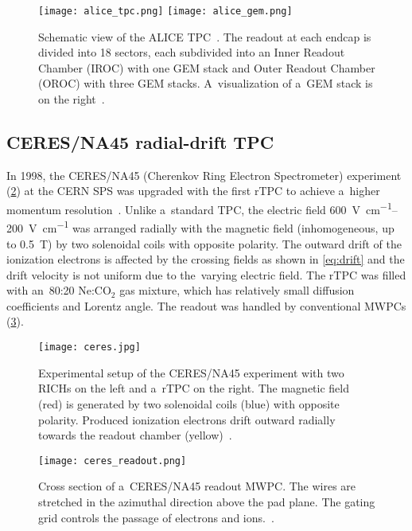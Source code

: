 			\begin{figure}
				\centering
				\texttt{[image: alice\_tpc.png]}
				\hfill
				\texttt{[image: alice\_gem.png]}
				\caption{Schematic view of the ALICE \ac{TPC}~\cite{ALICE_upgrade2}. The readout at each endcap is divided into 18 sectors, each subdivided into an Inner Readout Chamber (IROC) with one \ac{GEM} stack and Outer Readout Chamber (OROC) with three \ac{GEM} stacks. A~visualization of a~\ac{GEM} stack is on the right~\cite{ALICE_gem}.}
				\label{fig:alice}
			\end{figure}
			
		\subsection{CERES/NA45 radial-drift TPC}
			In 1998, the CERES/NA45 (Cherenkov Ring Electron Spectrometer) experiment (\cref{fig:ceres}) at the CERN SPS was upgraded with the first \acf{rTPC} to achieve a~higher momentum resolution~\cite{ceres}. Unlike a~standard \ac{TPC}, the electric field \qtyrange{600}{200}{\V\per\cm} was arranged radially with the magnetic field (inhomogeneous, up to \qty{0.5}{\tesla}) by two solenoidal coils with opposite polarity. The outward drift of the ionization electrons is affected by the crossing fields as shown in \cref{eq:drift} and the drift velocity is not uniform due to the~varying electric field. The \ac{rTPC} was filled with an~80:20 Ne:CO$_2$ gas mixture, which has relatively small diffusion coefficients and Lorentz angle. The readout was handled by conventional \acp{MWPC} (\cref{fig:ceres_readout}).
			
			\begin{figure}
				\centering
				\texttt{[image: ceres.jpg]}
				\caption{Experimental setup of the CERES/NA45 experiment with two \acfp{RICH} on the left and a~\ac{rTPC} on the right. The magnetic field (red) is generated by two solenoidal coils (blue) with opposite polarity. Produced ionization electrons drift outward radially towards the readout chamber (yellow)~\cite{ceres}.}
				\label{fig:ceres}
			\end{figure}
			\begin{figure}
				\centering
				\texttt{[image: ceres\_readout.png]}
				\caption{Cross section of a~CERES/NA45 readout \ac{MWPC}. The wires are stretched in the azimuthal direction above the pad plane. The gating grid controls the passage of electrons and ions.~\cite{ceres}.}
				\label{fig:ceres_readout}
			\end{figure}
			
